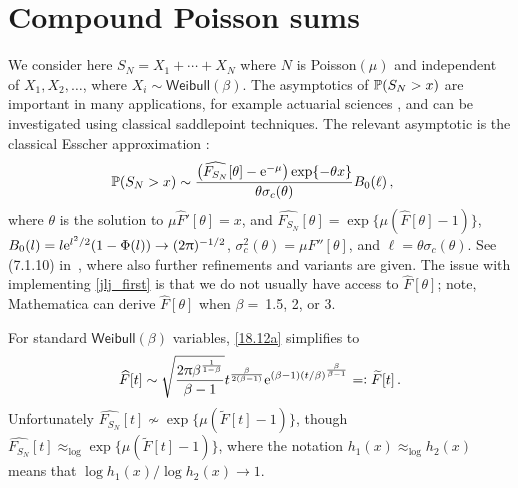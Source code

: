 \section{Compound Poisson sums}\label{S:CompP}
 We  consider here $S_N=X_1+\cdots+X_N$ where
$N$ is Poisson$(\mu)$ and independent of $X_1,X_2,\ldots$, where $X_i \sim \mathsf{Weibull}(\beta)$. The asymptotics of
$\operatorname{{\mathbb P}}(S_N>x)$ are important in many applications, for example actuarial sciences \cite{asmussen2010ruin}, and can be investigated using classical saddlepoint techniques. The relevant asymptotic is the classical Esscher approximation :
\begin{align}
	\operatorname{{\mathbb P}}(S_N > x) 
	&\sim \frac{
		\big( \widehat{F_{S_N}}[\theta] - \mathrm{e}^{-\mu} \big) \exp \{ -\theta x \}
	}{
		\theta \sigma_c(\theta)
	} B_0(\ell)  \label{jlj_first}  \,,
\end{align}
where $\theta$ is the solution to $\mu \widehat{F}'[\theta] = x$, and $\widehat{F_{S_N}}[\theta] = \exp \{ \mu (\widehat{F}[\theta] - 1 ) \}$, 
$B_0(l) = l \mathrm{e}^{l^2/2}(1 - \Phi(l)) \to (2\uppi)^{-1/2}$, $\sigma_c^2(\theta)= \mu F''[\theta]$, and $\ell = \theta \sigma_c(\theta)$. See (7.1.10) in~\cite{jensen1995saddlepoint},
where also further
refinements and variants are given. The issue with implementing \eqref{jlj_first} is that we do not usually have access to $\widehat{F}[\theta]$; note, Mathematica can derive $\widehat{F}[\theta]$ when $\beta =\ $1.5, 2, or 3.

For standard $\mathsf{Weibull}(\beta)$ variables, \eqref{18.12a} simplifies to%
\begin{align*} 
\widehat{F}[t] \sim \sqrt{\frac{2 \uppi \beta ^{\frac{1}{1-\beta }}}{\beta -1}}  t^{\frac{\beta}{2(\beta-1)}} \mathrm{e}^{(\beta -1) (t/\beta)^{\frac{\beta }{\beta -1}}} =: \widetilde{F}[t]\,.
\end{align*}
Unfortunately $\widehat{F_{S_N}}[t] \not\sim \exp\{\mu( \widetilde{F}[t] - 1)\}$, though $\widehat{F_{S_N}}[t] \approx_{\log} \exp\{\mu( \widetilde{F}[t] - 1)\}$, where the notation $h_1(x)\approx_{\log}h_2(x)$ means that $\log h_1(x)/\log h_2(x)\to 1$.

